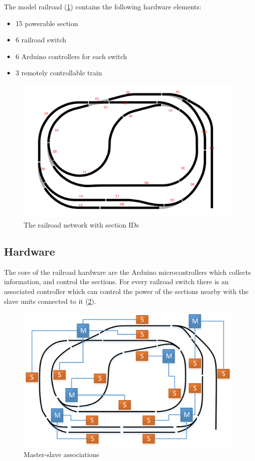 \noindent The model railroad (\cref{fig:case_study:total_map}) contains the following hardware elements:
\begin{itemize}
	\item 15 powerable section
	\item 6 railroad switch
	\item 6 Arduino controllers for each switch
	\item 3 remotely controllable train
\end{itemize}

\begin{figure}[h]
	\centering
	\includegraphics[width=\linewidth]{include/figures/chapter_6/total_view_1}
	\caption{The railroad network with section IDs}
	\label{fig:case_study:total_map}
\end{figure}

\subsection{Hardware}
The core of the railroad hardware are the Arduino microcontrollers which collects information, and control the sections. For every railroad switch there is an associated controller which can control the power of the sections nearby with the slave units connected to it (\cref{fig:case_study:master_slave}).

\begin{figure}[h]
	\centering
	\includegraphics[width=\linewidth]{include/figures/chapter_6/railroad_ms}
	\caption{Master-slave associations}
	\label{fig:case_study:master_slave}
\end{figure}

